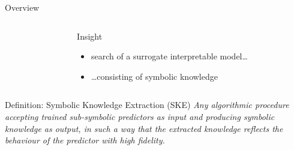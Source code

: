 \documentclass[presentation]{beamer}\mode<presentation>{\usetheme{AMSBolognaFC}}
\begin{document}
\begin{frame}[allowframebreaks]{Overview}
\begin{columns}
\begin{column}{0.19\linewidth}
        \end{column}
        \hfill
        \begin{column}{0.8\linewidth}
            \begin{block}{Insight}
                \begin{itemize}
                    \item search of a \alert{surrogate} interpretable model\ldots
                    \medskip
                    \item \ldots consisting of \alert{symbolic knowledge}
                \end{itemize}
            \end{block}
        \end{column}
    \end{columns}

    \framebreak

    \begin{block}{Definition: Symbolic Knowledge Extraction (SKE)}\centering\itshape
        Any \emph{algorithmic} procedure accepting \emph{trained} sub-symbolic predictors as input and producing \emph{symbolic} knowledge as output, in such a way that the extracted knowledge reflects the behaviour of the predictor with high \emph{fidelity}.
    \end{block}
\end{frame}
\end{document}
